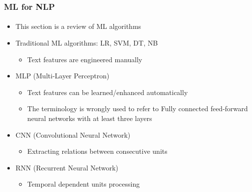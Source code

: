 \documentclass[xcolor=table]{beamer}
\begin{document}
	\begin{frame}
		\frametitle{ML for NLP}
		\framesubtitle{\insertsection}
		
		\begin{itemize}
			\item This section is a review of ML algorithms
			\item Traditional ML algorithms: LR, SVM, DT, NB
			\begin{itemize}
				\item Text features are engineered manually
			\end{itemize}
			\item MLP (Multi-Layer Perceptron)
			\begin{itemize}
				\item Text features can be learned/enhanced automatically
				\item The terminology is wrongly used to refer to Fully connected feed-forward neural networks with at least three layers
			\end{itemize}
			\item CNN (Convolutional Neural Network)
			\begin{itemize}
				\item Extracting relations between consecutive units
			\end{itemize}
			\item RNN (Recurrent Neural Network)
			\begin{itemize}
				\item Temporal dependent units processing
			\end{itemize}
		\end{itemize}
		
	\end{frame}
\end{document}
